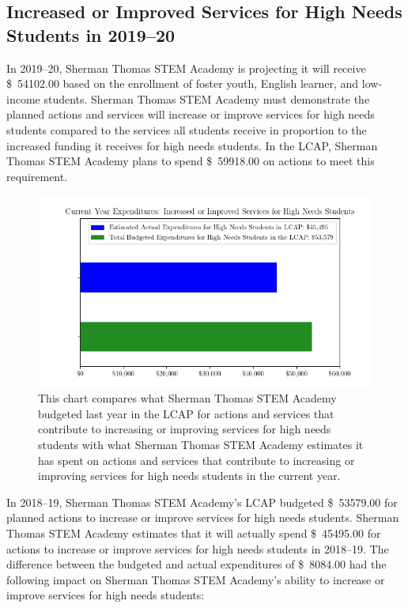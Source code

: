 \documentclass{article}
\newcommand{\dollar}[1]{\SI{#1}[\$]{}}
\newcounter{goal}[section] %
\newcounter{action}[goal]
\begin{document}
\subsection{Increased or Improved Services for High Needs Students in 2019--20}
In 2019--20, Sherman Thomas STEM Academy is projecting it will receive \dollar{54102.00} based on the enrollment of foster youth, English learner, and low-income students. Sherman Thomas STEM Academy must demonstrate the planned actions and services will increase or improve services for high needs students compared to the services all students receive in proportion to the increased funding it receives for high needs students. In the LCAP, Sherman Thomas STEM Academy plans to spend \dollar{59918.00} on actions to meet this requirement.

\begin{figure}[h!btp]
\centering
\includegraphics[scale=0.8]{serv}
\caption*{This chart compares what Sherman Thomas STEM Academy budgeted last year in the LCAP for actions and services that contribute to increasing or improving services for high needs students with what  Sherman Thomas STEM Academy estimates it has spent on actions and services that contribute to increasing or improving services for high needs students in the current year.}
\end{figure}

In 2018--19, Sherman Thomas STEM Academy's LCAP budgeted \dollar{53579.00} for planned actions to increase or improve services for high needs students. Sherman Thomas STEM Academy estimates that it will actually spend \dollar{45495.00} for actions to increase or improve services for high needs students in 2018--19. The difference between the budgeted and actual expenditures of \dollar{8084.00} had the following impact on Sherman Thomas STEM Academy's ability to increase or improve services for high needs students:
 
\end{document}
